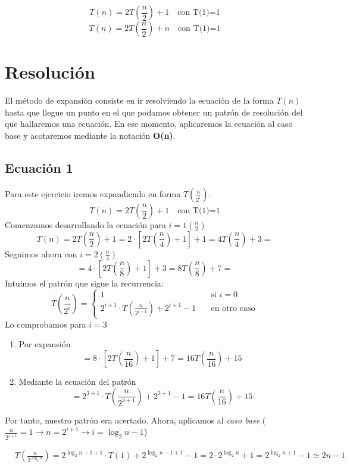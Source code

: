 \documentclass[12pt,spanish]{article}
\begin{document}
\begin{equation}
T(n)=2T(\frac{n}{2})+1 \quad \text{con T(1)=1}
\end{equation}
\begin{equation}
T(n)=2T(\frac{n}{2})+n \quad \text{con T(1)=1}
\end{equation}

\section{Resolución}
El método de expansión consiste en ir resolviendo la ecuación de la forma $T(n)$ hasta que llegue un punto en el que podamos obtener un patrón de resolución del que hallaremos una ecuación.
En ese momento, aplicaremos la ecuación al caso base y acotaremos mediante la notación \textbf{O(n)}.
\subsection{Ecuación 1}
Para este ejercicio iremos expandiendo en forma $T(\frac{n}{2^i})$.
\[T(n)=2T(\frac{n}{2})+1 \quad \text{con T(1)=1}\]
Comenzamos desarrollando la ecuación para $i=1 (\frac{n}{2})$
\[T(n)= 2T(\frac{n}{2})+1 =2 \cdot \left[2T(\frac{n}{4})+1\right]+1 = 4T(\frac{n}{4})+3= \]
Seguimos ahora con $i=2 (\frac{n}{4})$
\[= 4 \cdot \left[2T(\frac{n}{8})+1\right]+3 = 8T(\frac{n}{8}) + 7 = \]
Intuimos el patrón que sigue la recurrencia:
\[T(\frac{n}{2^i})=
\begin{cases}
	1 & \quad \text{si } i = 0  \\
	2^{i+1} \cdot T(\frac{n}{2^{i+1}}) + 2^{i+1} - 1 & \quad \text{en otro caso}
\end{cases}
\]
Lo comprobamos para $i=3$
\begin{enumerate}
\item Por expansión
\[ = 8 \cdot \left[2T(\frac{n}{16})+1\right]+7=16T(\frac{n}{16})+15\]
\item Mediante la ecuación del patrón
\[ =2^{3+1} \cdot T(\frac{n}{2^{3+1}}) + 2^{3+1} - 1 = 16T(\frac{n}{16})+15 \]
\end{enumerate}
Por tanto, nuestro patrón era acertado. Ahora, aplicamos al \textit{caso base} ($\frac{n}{2^{i+1}} = 1 \rightarrow n=2^{i+1} \rightarrow i=\log_2n-1$)

\begin{equation}
\begin{split}
&T(\frac{n}{2^{\log_2n}})=2^{\log_2n-1 + 1} \cdot T(1) + 2^{\log_2n-1+1} - 1= 2 \cdot 2^{\log_2n} + 1 = 2^{\log_2n+1} - 1 \simeq 2n-1
\end{split}
\end{equation}
\end{document}
